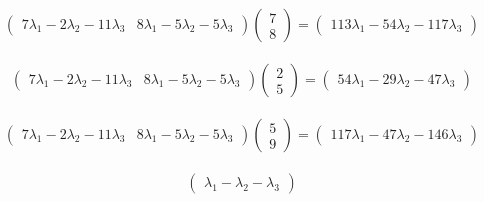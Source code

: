 \documentclass[12pt]{report}
\begin{document}
\begin{equation}
	\begin{aligned}
		\begin{pmatrix}7\lambda_{1}-2\lambda_{2}-11\lambda_{3} & 8\lambda_{1}-5\lambda_{2}-5\lambda_{3}\end{pmatrix}\begin{pmatrix}7 \\ 8\end{pmatrix}=\begin{pmatrix}113\lambda_{1}-54\lambda_{2}-117\lambda_{3}\end{pmatrix}
	\end{aligned}
\end{equation}

\begin{equation}
	\begin{aligned}
		\begin{pmatrix}7\lambda_{1}-2\lambda_{2}-11\lambda_{3} & 8\lambda_{1}-5\lambda_{2}-5\lambda_{3}\end{pmatrix}\begin{pmatrix}2 \\ 5\end{pmatrix}=\begin{pmatrix}54\lambda_{1}-29\lambda_{2}-47\lambda_{3}\end{pmatrix}
	\end{aligned}
\end{equation}

\begin{equation}
	\begin{aligned}
		\begin{pmatrix}7\lambda_{1}-2\lambda_{2}-11\lambda_{3} & 8\lambda_{1}-5\lambda_{2}-5\lambda_{3}\end{pmatrix}\begin{pmatrix}5 \\ 9\end{pmatrix}=\begin{pmatrix}117\lambda_{1}-47\lambda_{2}-146\lambda_{3}\end{pmatrix}
	\end{aligned}
\end{equation}

\begin{equation}
	\begin{aligned}
		\begin{pmatrix}\lambda_{1}-\lambda_{2}-\lambda_{3}\end{pmatrix}
	\end{aligned}
\end{equation}
\end{document}
